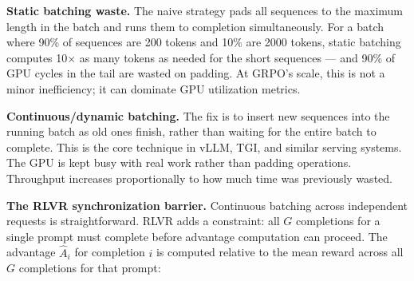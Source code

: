 \textbf{Static batching waste.} The naive strategy pads all sequences to the maximum length in the batch and runs them to completion simultaneously. For a batch where 90\% of sequences are 200 tokens and 10\% are 2000 tokens, static batching computes 10$\times$ as many tokens as needed for the short sequences --- and 90\% of GPU cycles in the tail are wasted on padding. At GRPO's scale, this is not a minor inefficiency; it can dominate GPU utilization metrics.

\begin{center}
\end{center}

\textbf{Continuous/dynamic batching.} The fix is to insert new sequences into the running batch as old ones finish, rather than waiting for the entire batch to complete. This is the core technique in vLLM, TGI, and similar serving systems. The GPU is kept busy with real work rather than padding operations. Throughput increases proportionally to how much time was previously wasted.

\textbf{The RLVR synchronization barrier.} Continuous batching across independent requests is straightforward. RLVR adds a constraint: all $G$ completions for a single prompt must complete before advantage computation can proceed. The advantage $\hat{A}_i$ for completion $i$ is computed relative to the mean reward across all $G$ completions for that prompt:

